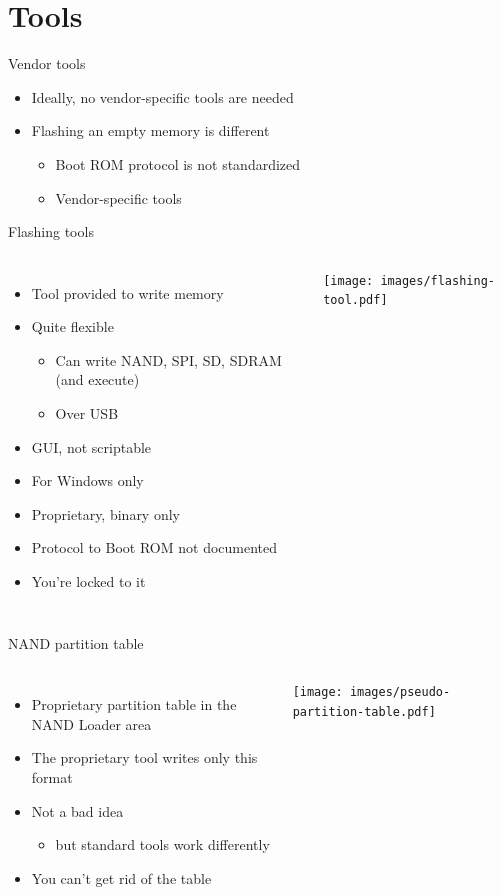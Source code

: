 \documentclass[xetex,table]{beamer}
\begin{document}
\section{Tools}

\begin{frame}{Vendor tools}
  \begin{itemize}
  \item Ideally, no vendor-specific tools are needed
  \item Flashing an empty memory is different
    \begin{itemize}
    \item Boot ROM protocol is not standardized
    \item Vendor-specific tools
    \end{itemize}
  \end{itemize}
\end{frame}

\begin{frame}{Flashing tools}
  \begin{columns}
    \begin{itemize}
    \item Tool provided to write memory
    \item Quite flexible
      \begin{itemize}
      \item Can write NAND, SPI, SD, SDRAM (and execute)
      \item Over USB
      \end{itemize}
    \item GUI, not scriptable
    \item For Windows only
    \item Proprietary, binary only
    \item Protocol to Boot ROM not documented
    \item[\textrightarrow] You're locked to it
    \end{itemize}
  \texttt{[image: images/flashing-tool.pdf]}
  \end{columns}
\end{frame}

\begin{frame}{NAND partition table}
  \begin{columns}
    \begin{itemize}
    \item Proprietary partition table in the NAND Loader area
    \item The proprietary tool writes only this format
    \item Not a bad idea
      \begin{itemize}
        \item but standard tools work differently
    \end{itemize}
    \item[\textrightarrow] You can't get rid of the table
    \end{itemize}
    \texttt{[image: images/pseudo-partition-table.pdf]}
  \end{columns}
\end{frame}
\end{document}

